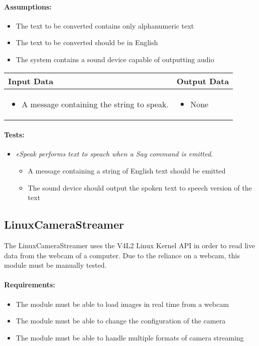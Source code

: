 \documentclass[english,12pt]{scrartcl}
\newcounter{testcounter}
\newcommand{\test}[1] {
	\stepcounter{testcounter}
	\item[] \emph{#1}.}
\begin{document}
		\paragraph{Assumptions:}
		\begin{itemize}
			\item The text to be converted contains only alphanumeric text
			\item The text to be converted should be in English
			\item The system contains a sound device capable of outputting audio
		\end{itemize}

		\begin{tabular}{p{7cm}|p{7cm}}
    			\textbf{Input Data} & \textbf{Output Data} \\ \hline
			\begin{itemize}
				\item A message containing the string to speak.
			\end{itemize}
			&
			\begin{itemize}
				\item None
			\end{itemize}
		\end{tabular}

		\paragraph{Tests:}
		\begin{itemize}
			\test{eSpeak performs text to speach when a Say command is emitted}
			\begin{itemize}
				\item A message containing a string of English text should be emitted
				\item The sound device should output the spoken text to speech version of the text
			\end{itemize}
		\end{itemize}

	\subsection{LinuxCameraStreamer}
		The LinuxCameraStreamer uses the V4L2 Linux Kernel API in order to read live data from the webcam of a computer.
		Due to the reliance on a webcam, this module must be manually tested.

		\paragraph{Requirements:}
		\begin{itemize}
			\item The module must be able to load images in real time from a webcam
			\item The module must be able to change the configuration of the camera
			\item The module must be able to handle multiple formats of camera streaming
		\end{itemize}
\end{document}
